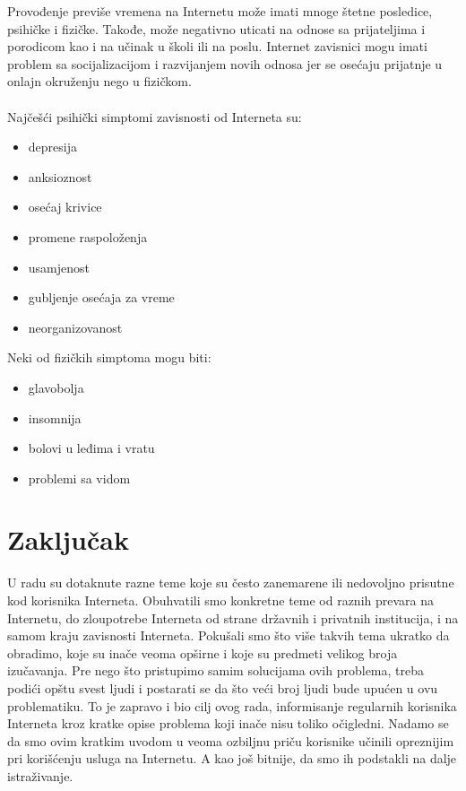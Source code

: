 \documentclass[a4paper]{article}
\begin{document}
Provođenje previše vremena na Internetu može imati mnoge štetne posledice, psihičke i fizičke. Takođe, može negativno uticati na odnose sa prijateljima i porodicom kao i na učinak u školi ili na poslu.
Internet zavisnici mogu imati problem sa socijalizacijom i razvijanjem novih odnosa jer se osećaju prijatnje u onlajn okruženju nego u fizičkom.\\\\ Najčešći psihički simptomi zavisnosti od Interneta su:
\begin{multicols}{2}
\begin{itemize}
    \item depresija
    \item anksioznost
    \item osećaj krivice
    \item promene raspoloženja
    \item usamjenost
    \item gubljenje osećaja za vreme
    \item neorganizovanost
\end{itemize}
\end{multicols}


Neki od fizičkih simptoma mogu biti:
\begin{multicols}{2}
\begin{itemize}
    \item glavobolja
    \item insomnija
    \item bolovi u leđima i vratu
    \item problemi sa vidom
\end{itemize}
\end{multicols}


\section{Zaključak}
\label{sec:zakljucak}
U radu su dotaknute razne teme koje su često zanemarene ili nedovoljno prisutne kod korisnika Interneta. Obuhvatili smo konkretne teme od raznih prevara na Internetu, do zloupotrebe Interneta od strane državnih i privatnih institucija, i na samom kraju zavisnosti Interneta. Pokušali smo što više takvih tema ukratko da obradimo, koje su inače veoma opširne i koje su predmeti velikog broja izučavanja. Pre nego što pristupimo samim solucijama ovih problema, treba podići opštu svest ljudi i postarati se da što veći broj ljudi bude upućen u ovu problematiku. To je zapravo i bio cilj ovog rada, informisanje regularnih korisnika Interneta kroz kratke opise problema koji inače nisu toliko očigledni. Nadamo se da smo ovim kratkim uvodom u veoma ozbiljnu priču korisnike učinili opreznijim pri korišćenju usluga na Internetu. A kao još bitnije, da smo ih podstakli na dalje istraživanje.

\appendix
 

\appendix
\end{document}
